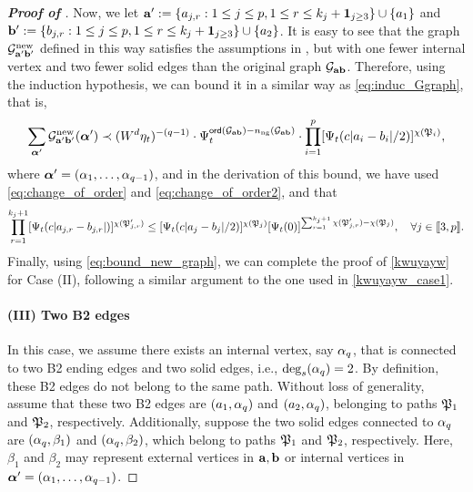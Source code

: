 \begin{proof}[\bf Proof of ]
 
Now, we let ${\mathbf{a}}':=\{a_{j,r}:1\le j \le p, 1\le r \le k_j+\mathbf 1_{j\ge 3}\}\cup\{a_1\}$ and ${\mathbf{b}}':=\{b_{j,r}:1\le j \le p, 1\le r \le k_j+\mathbf 1_{j\ge 3}\}\cup\{a_2\}$. It is easy to see that the graph $\mathcal G^{\mathrm{new}}_{{\mathbf{a}}'{\mathbf{b}}'}$ defined in this way satisfies the assumptions in , but with one fewer internal vertex and two fewer solid edges than the original graph $\mathcal G_{{\mathbf{a}}{\mathbf{b}}}$. 
Therefore, using the induction hypothesis, we can bound it in a similar way as \eqref{eq:induc_Ggraph}, that is,
\begin{align}\label{eq:bound_new_graph}
\sum_{{\boldsymbol{\alpha}}'} \mathcal G^{\mathrm{new}}_{{\mathbf{a}}'{\mathbf{b}}'}({\boldsymbol{\alpha}}') \prec (W^d\eta_t)^{-(q-1)}\cdot \Psi_t^{{\mathsf{ord}}(\mathcal G_{{\mathbf{a}}{\mathbf{b}}})-n_{\mathrm{ng}}(\mathcal G_{{\mathbf{a}}{\mathbf{b}}})}\cdot  \prod_{i=1}^p  [\Psi_t(c|a_i-b_i|/2)]^{\chi(\mathfrak{P}_i)} ,
\end{align}
where ${\boldsymbol{\alpha}}'=(\alpha_1,\ldots,\alpha_{q-1})$, and in the derivation of this bound, we have used \eqref{eq:change_of_order} and \eqref{eq:change_of_order2}, and that 
$$
  \prod_{r=1}^{k_j+1} [\Psi_t(c|a_{j,r}- b_{j,r}|)]^{\chi(\mathfrak{P}'_{j,r})} \le [\Psi_t (c|a_{j}- b_{j}|/2)]^{\chi(\mathfrak{P}_{j})} [\Psi_t(0)]^{\sum_{r=1}^{k_j+1}\chi(\mathfrak{P}'_{j,r})- \chi(\mathfrak{P}_{j})},\quad \forall j\in\llbracket{3,p}\rrbracket.
 $$
Finally, using \eqref{eq:bound_new_graph}, we can complete the proof of \eqref{kwuyayw} for Case (II), following a similar argument to the one used in \eqref{kwuyayw_case1}.


\medskip
\paragraph{\bf (III) Two B2 edges}
In this case, we assume there exists an internal vertex, say $\alpha_q$, that is connected to two B2 ending edges and two solid edges, i.e., $\deg_s(\alpha_q)=2$. By definition, these B2 edges do not belong to the same path. Without loss of generality, assume that these two B2 edges are $(a_1, \alpha_q)$ and $(a_2, \alpha_q)$, belonging to paths $\mathfrak{P}_1$ and $\mathfrak{P}_2$, respectively. 
Additionally, suppose the two solid edges connected to $\alpha_q$ are $(\alpha_q, \beta_1)$ and $(\alpha_q, \beta_2)$, which belong to paths $\mathfrak{P}_1$ and $\mathfrak{P}_2$, respectively. Here, $\beta_1$ and $\beta_2$ may represent external vertices in ${\mathbf{a}}, {\mathbf{b}}$ or internal vertices in ${\boldsymbol{\alpha}}' = (\alpha_1, \ldots, \alpha_{q-1})$.
 


\end{proof}
